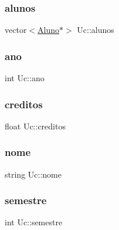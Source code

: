 \subsubsection{\texorpdfstring{alunos}{alunos}}
{\footnotesize\ttfamily vector$<$\hyperlink{class_aluno}{Aluno}$\ast$$>$ Uc\+::alunos\hspace{0.3cm}{\ttfamily [protected]}}

\hypertarget{class_uc_aefaa6dc015733603451294d3e2efaa83}{}\label{class_uc_aefaa6dc015733603451294d3e2efaa83} 
\subsubsection{\texorpdfstring{ano}{ano}}
{\footnotesize\ttfamily int Uc\+::ano\hspace{0.3cm}{\ttfamily [protected]}}

\hypertarget{class_uc_a0d64adeb7bc81560097dc7c6e9e2dff1}{}\label{class_uc_a0d64adeb7bc81560097dc7c6e9e2dff1} 
\subsubsection{\texorpdfstring{creditos}{creditos}}
{\footnotesize\ttfamily float Uc\+::creditos\hspace{0.3cm}{\ttfamily [protected]}}

\hypertarget{class_uc_af2971baa3ea283ba5fec29170de3fbe9}{}\label{class_uc_af2971baa3ea283ba5fec29170de3fbe9} 
\subsubsection{\texorpdfstring{nome}{nome}}
{\footnotesize\ttfamily string Uc\+::nome\hspace{0.3cm}{\ttfamily [protected]}}

\hypertarget{class_uc_a5e91075b035d68f536d35683c50c9bae}{}\label{class_uc_a5e91075b035d68f536d35683c50c9bae} 
\subsubsection{\texorpdfstring{semestre}{semestre}}
{\footnotesize\ttfamily int Uc\+::semestre\hspace{0.3cm}{\ttfamily [protected]}}

\hypertarget{class_uc_a5d6fb389c3634d6c4f4b92877e4e0e39}{}\label{class_uc_a5d6fb389c3634d6c4f4b92877e4e0e39} 
